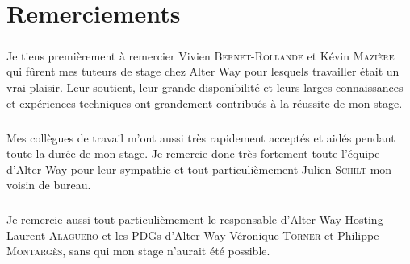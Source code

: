 \chapter*{Remerciements}

\paragraph*{}
Je tiens premièrement à remercier Vivien \textsc{Bernet-Rollande} et Kévin \textsc{Mazière} qui fûrent mes tuteurs de stage chez Alter Way pour lesquels travailler était un
vrai plaisir. Leur soutient, leur grande disponibilité et leurs larges connaissances et expériences techniques ont grandement contribués à la réussite de mon stage.

\paragraph*{}
Mes collègues de travail m'ont aussi très rapidement acceptés et aidés pendant toute la durée de mon stage. Je remercie donc très fortement toute l'équipe
d'Alter Way pour leur sympathie et tout particulièmement Julien \textsc{Schilt} mon voisin de bureau.

\paragraph*{}
Je remercie aussi tout particulièmement le responsable d'Alter Way Hosting Laurent \textsc{Alaguero} et les PDGs d'Alter Way Véronique \textsc{Torner} et
Philippe \textsc{Montargès}, sans qui mon stage n'aurait été possible.


